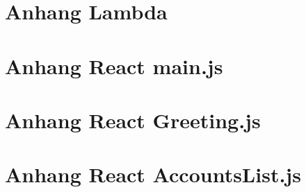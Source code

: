 \documentclass[12pt,titlepage,twoside]{article}
\begin{document}



\newpage
{}


\clearpage
\setcounter{page}{0}

\renewcommand{\thepage}{A-\arabic{page}}

\begin{appendices}

  \section{Anhang Lambda}
  

\section{Anhang React main.js}


\section{Anhang React Greeting.js}


\section{Anhang React AccountsList.js}




\end{appendices}


\end{document}
